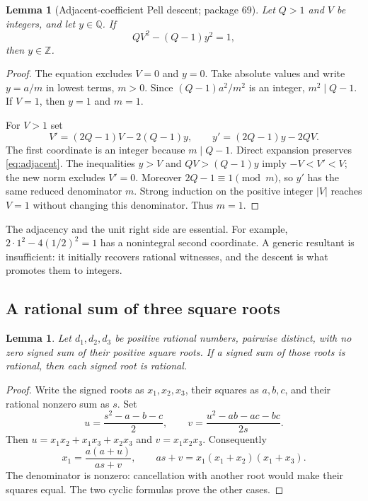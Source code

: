 \documentclass[11pt]{article}
\newtheorem{lemma}[theorem]{Lemma}
\theoremstyle{definition}
\theoremstyle{remark}
\newcommand{\Z}{\mathbb Z}
\newcommand{\Q}{\mathbb Q}
\begin{document}
\begin{lemma}[Adjacent-coefficient Pell descent; package 69]\label{lem:descent}
Let $Q>1$ and $V$ be integers, and let $y\in\Q$. If
\begin{equation}\label{eq:adjacent}
 QV^2-(Q-1)y^2=1,
\end{equation}
then $y\in\Z$.
\end{lemma}
\begin{proof}
The equation excludes $V=0$ and $y=0$. Take absolute values and write
$y=a/m$ in lowest terms, $m>0$. Since $(Q-1)a^2/m^2$ is an integer,
$m^2\mid Q-1$. If $V=1$, then $y=1$ and $m=1$.

For $V>1$ set
\[
 V'=(2Q-1)V-2(Q-1)y,\qquad
 y'=(2Q-1)y-2QV.
\]
The first coordinate is an integer because $m\mid Q-1$. Direct expansion
preserves \eqref{eq:adjacent}. The inequalities $y>V$ and
$QV>(Q-1)y$ imply $-V<V'<V$; the new norm excludes $V'=0$.
Moreover $2Q-1\equiv1\pmod m$, so $y'$ has the same reduced denominator
$m$. Strong induction on the positive integer $|V|$ reaches $V=1$ without
changing this denominator. Thus $m=1$.
\end{proof}

The adjacency and the unit right side are essential. For example,
$2\cdot1^2-4(1/2)^2=1$ has a nonintegral second coordinate. A generic
resultant is insufficient: it initially recovers rational witnesses, and
the descent is what promotes them to integers.

\subsection{A rational sum of three square roots}

\begin{lemma}\label{lem:three}
Let $d_1,d_2,d_3$ be positive rational numbers, pairwise distinct, with no
zero signed sum of their positive square roots. If a signed sum of those
roots is rational, then each signed root is rational.
\end{lemma}
\begin{proof}
Write the signed roots as $x_1,x_2,x_3$, their squares as $a,b,c$, and
their rational nonzero sum as $s$. Set
\[
 u=\frac{s^2-a-b-c}{2},\qquad
 v=\frac{u^2-ab-ac-bc}{2s}.
\]
Then $u=x_1x_2+x_1x_3+x_2x_3$ and $v=x_1x_2x_3$. Consequently
\[
 x_1=\frac{a(a+u)}{as+v},\qquad
 as+v=x_1(x_1+x_2)(x_1+x_3).
\]
The denominator is nonzero: cancellation with another root would make
their squares equal. The two cyclic formulas prove the other cases.
\end{proof}
\end{document}
